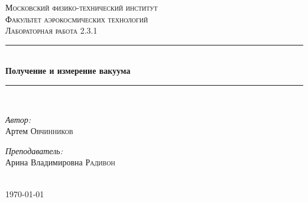 \documentclass[a4paper,12pt]{article} %
\begin{document}
\begin{titlepage}
\newcommand{\HRule}{\rule{\linewidth}{0.3 mm}} %

\center %
 

\textsc{\Large Московский физико-технический институт }\\[1.5cm] %
\textsc{\Large Факультет аэрокосмических технологий}\\[0.5cm] %
\textsc{\large Лабораторная работа 2.3.1}\\[0.5cm] %


\HRule \\[0.4cm]
{ \huge \bfseries Получение и измерение вакуума }\\[0.4cm] %
\HRule \\[1.5cm]
 

\begin{minipage}{0.4\textwidth}
\begin{flushleft} \large
\emph{Автор:}\\ Артем \textsc{Овчинников} %
\end{flushleft}
\end{minipage}
\begin{minipage}{0.4\textwidth}
\begin{flushright} \large
\emph{Преподаватель:} \\
Арина Владимировна \textsc{Радивон} %
\end{flushright}
\end{minipage}\\[4cm]

{\large \today}\\[2cm] %


 

\vfill %

\end{titlepage}
\tableofcontents
\newpage
\end{document}

